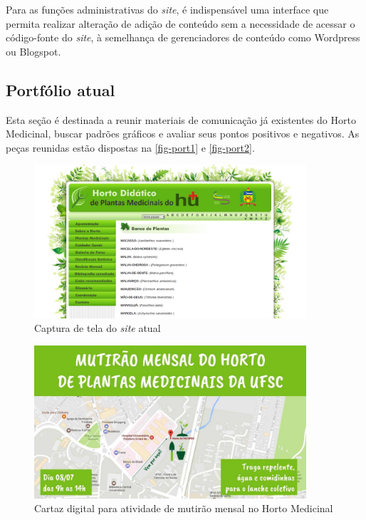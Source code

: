 Para as funções administrativas do \emph{site}, é indispensável uma interface que permita realizar alteração de adição de conteúdo sem a necessidade de acessar o código-fonte do \emph{site}, à semelhança de gerenciadores de conteúdo como Wordpress ou Blogspot.

\subsection{Portfólio atual}\label{portfolio-atual}

Esta seção é destinada a reunir materiais de comunicação já existentes do Horto Medicinal, buscar padrões gráficos e avaliar seus pontos positivos e negativos. As peças reunidas estão dispostas na \autoref{fig-port1} e \autoref{fig-port2}.

\begin{figure}[!htbp]
\centering
\caption{\label{fig-port1}Captura de tela do \textit{site} atual}
\includegraphics[width=0.9\textwidth]{images/drive/image_8.png}
\end{figure}


\begin{figure}[!htbp]
\centering
\caption{\label{fig-port2}Cartaz digital para atividade de mutirão mensal no Horto Medicinal}
\includegraphics[width=0.9\textwidth]{images/drive/image_9.jpg}
\end{figure}

